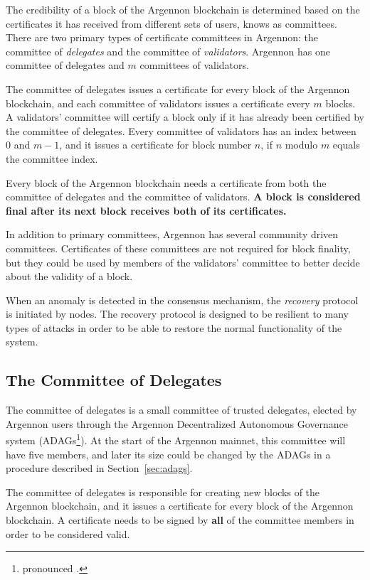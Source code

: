 
The credibility of a block of the Argennon blockchain is determined based on the certificates it has received
from different sets of users, knows as committees. There are two primary types of certificate committees in
Argennon: the committee of \emph{delegates} and the committee
of \emph{validators}. Argennon has one committee of delegates and $m$ committees of validators.

The committee of delegates issues a certificate for every block of the Argennon blockchain, and each
committee of validators issues a certificate every $m$ blocks. A validators' committee will
certify a block only if it has already been certified by the committee of delegates. Every committee of validators has
an index between $0$ and $m - 1$, and it issues a certificate for block number $n$, if $n$ modulo $m$ equals
the committee index.

Every block of the Argennon blockchain needs a certificate from both the committee of delegates and
the committee of validators. \textbf{A block is considered final after its next block receives both of
its certificates.}

In addition to primary committees, Argennon has several community driven committees. Certificates of these
committees are not required for block finality, but they could be used by members of the
validators' committee to better decide about the validity of a block.

When an anomaly is detected in the consensus mechanism, the \emph{recovery} protocol is initiated by nodes. The
recovery protocol is designed to be resilient to many types of attacks in order to be able to restore the normal
functionality of the system.

\subsection{The Committee of Delegates}\label{subsec:the-committee-of-delegates}

The committee of delegates is a small committee of trusted delegates, elected by Argennon users through the
Argennon Decentralized Autonomous Governance system (ADAGs\footnote{pronounced .}).
At the start of the Argennon mainnet, this committee will have
five members, and later its size could be changed by the ADAGs in a procedure described
in Section~\ref{sec:adags}.

The committee of delegates is responsible for creating new blocks of the Argennon blockchain, and it issues a
certificate for every block of the Argennon blockchain. A certificate needs to be signed
by \textbf{all} of the committee members in order to be considered valid.

